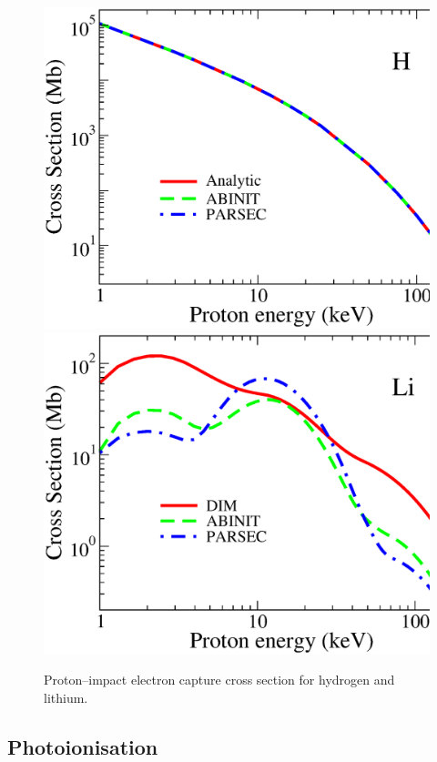 \documentclass[10pt]{article}
\begin{document}
\begin{figure}[H]
\centering
 \includegraphics[height=0.23\textheight]{figures/pseudopot/captureH.eps}
 \hspace{0.3cm}
 \includegraphics[height=0.23\textheight]{figures/pseudopot/captureLi.eps}
 \caption{Proton--impact electron capture cross section for hydrogen and 
 lithium.}
 \label{fig:captureH}
\end{figure}

\subsection{Photoionisation}
\label{sec:photo}
\end{document}
